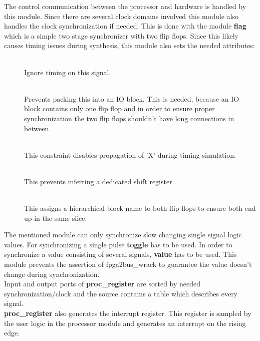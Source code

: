 \documentclass[11pt,technote,a4paper,onecolumn]{IEEEtran}
\newcommand{\signal}[1]{{\ttfamily #1}}
\newcommand{\module}[1]{{\ttfamily\bfseries #1}}
\begin{document}
The control communication between the processor and hardware is handled by this
module. Since there are several clock domains involved this module also handles
the clock synchronization if needed. This is done with the module \module{flag}
which is a simple two stage synchronizer with two flip flops. Since this likely
causes timing issues during synthesis, this module also sets the needed
attributes:
\begin{description}
    \item[] \hfill \\
        Ignore timing on this signal.
    \item[] \hfill \\
        Prevents packing this into an IO block. This is needed,
        because an IO block contains only one flip flop and in order to ensure
        proper synchronization the two flip flops shouldn't have long
        connections in between.
    \item[] \hfill \\
        This constraint disables propagation of 'X' during timing simulation.
    \item[] \hfill \\
        This prevents inferring a dedicated shift register.
    \item[] \hfill \\
        This assigns a hierarchical block name to both flip flops to ensure
        both end up in the same slice.
\end{description}
The mentioned module can only synchronize slow changing single signal logic
values. For
synchronizing a single pulse \module{toggle} has to be used. In order to
synchronize a value consisting of several signals, \module{value} has to
be used. This module prevents the assertion of \signal{fpga2bus\_wrack}
to guarantee the value doesn't change during synchronization.\\
Input and output ports of \module{proc\_register} are sorted by
needed synchronization/clock and the source contains a table which describes
every signal.\\
\module{proc\_register} also generates the interrupt register. This register
is sampled by the user logic in the processor module and generates an
interrupt on the rising edge.\\
\end{document}
